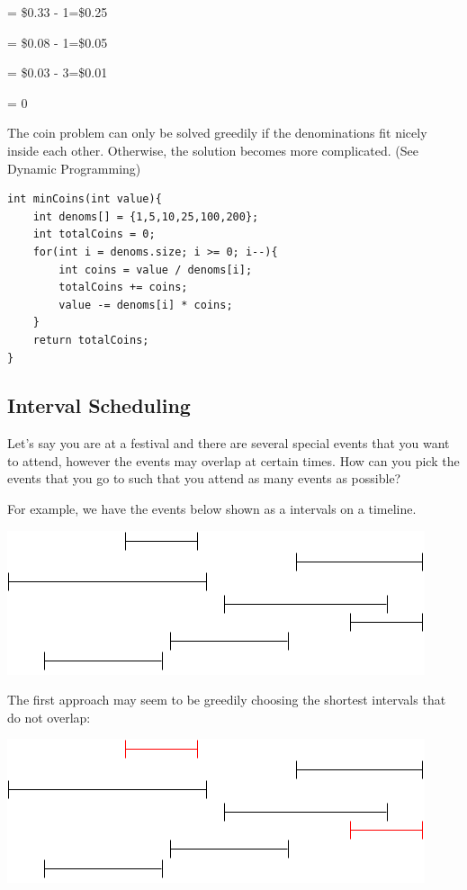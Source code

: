 \documentclass[11pt,oneside]{book}
\makeatletter
\def\maxwidth#1{\ifdim\Gin@nat@width>#1 #1\else\Gin@nat@width\fi}
\makeatother
\begin{document}
= \$0.33 - 1=\$0.25

= \$0.08 - 1=\$0.05

= \$0.03 - 3=\$0.01

= 0

The coin problem can only be solved greedily if the denominations fit nicely inside each other. Otherwise, the solution becomes more complicated. (See Dynamic Programming)

\begin{lstlisting}
int minCoins(int value){
    int denoms[] = {1,5,10,25,100,200};
    int totalCoins = 0;
    for(int i = denoms.size; i >= 0; i--){
        int coins = value / denoms[i];
        totalCoins += coins;
        value -= denoms[i] * coins;
    }
    return totalCoins;
}
\end{lstlisting}

\subsection{Interval Scheduling}

Let's say you are at a festival and there are several special events that you want to attend, however the events may overlap at certain times. How can you pick the events that you go to such that you attend as many events as possible?

For example, we have the events below shown as a intervals on a timeline.

\vspace{5px}\includegraphics[width=\maxwidth{\textwidth}]{intervalschedule.png}

The first approach may seem to be greedily choosing the shortest intervals that do not overlap:

\vspace{5px}\includegraphics[width=\maxwidth{\textwidth}]{intervalschedule2.png}
\end{document}
